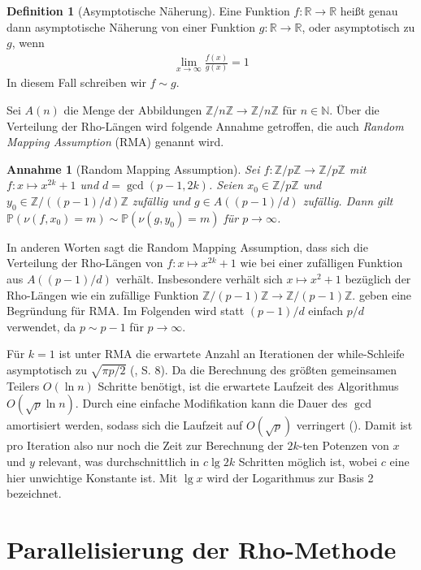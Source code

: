 \documentclass[a4paper, 11pt, ngerman]{article}
\newcommand{\N}{\mathbb{N}}
\newcommand{\R}{\mathbb{R}}
\newcommand{\Z}{\mathbb{Z}}
\renewcommand{\P}{\mathbb{P}}
\theoremstyle{definition}
\newtheorem{definition}{Definition}
\theoremstyle{plain}
\newtheorem*{assumption*}{Annahme}
\theoremstyle{remark}
\begin{document}
\begin{definition}[Asymptotische Näherung]
    Eine Funktion $f : \R \to \R$ heißt genau dann asymptotische Näherung von einer Funktion $g : \R \to \R$, oder asymptotisch zu $g$, wenn
    \begin{align*}
        \lim_{x \to \infty} \frac {f(x)} {g(x)} = 1
    \end{align*}
    In diesem Fall schreiben wir $f \sim g$.
\end{definition}

\noindent Sei $A(n)$ die Menge der Abbildungen $\Z/n\Z \to \Z/n\Z$ für $n \in \N$. Über die Verteilung der Rho-Längen wird folgende Annahme getroffen, die auch \emph{Random Mapping Assumption} (RMA) genannt wird.

\begin{assumption*}[Random Mapping Assumption]
    Sei $f: \Z/p\Z \to \Z/p\Z$ mit $f : x \mapsto x^{2k} + 1$ und $d = \gcd(p - 1, 2k)$. Seien $x_0 \in \Z/p\Z$ und $y_0 \in \Z/((p - 1)/d)\Z$ zufällig und $g \in A((p - 1)/d)$ zufällig. Dann gilt $\P(\nu(f, x_0) = m) \sim \P(\nu(g, y_0) = m)$ für $p \to \infty$.
\end{assumption*}

\noindent In anderen Worten sagt die Random Mapping Assumption, dass sich die Verteilung der Rho-Längen von $f : x \mapsto x^{2k} + 1$ wie bei einer zufälligen Funktion aus $A((p - 1)/d)$ verhält. Insbesondere verhält sich $x \mapsto x^2 + 1$ bezüglich der Rho-Längen wie ein zufällige Funktion $\Z/(p - 1)\Z \to \Z/(p - 1)\Z$. \cite{bp81} geben eine Begründung für RMA. Im Folgenden wird statt $(p - 1)/d$ einfach $p/d$ verwendet, da $p \sim p - 1$ für $p \to \infty$.

Für $k = 1$ ist unter RMA die erwartete Anzahl an Iterationen der while-Schleife asymptotisch zu $\sqrt{\pi p / 2}$ (\cite{knu98}, S. 8). Da die Berechnung des größten gemeinsamen Teilers $O(\ln n)$ Schritte benötigt, ist die erwartete Laufzeit des Algorithmus $O(\sqrt p \ln n)$. Durch eine einfache Modifikation kann die Dauer des $\gcd$ amortisiert werden, sodass sich die Laufzeit auf $O(\sqrt p)$ verringert (\cite{bre80}). Damit ist pro Iteration also nur noch die Zeit zur Berechnung der $2k$-ten Potenzen von $x$ und $y$ relevant, was durchschnittlich in $c \lg 2k$ Schritten möglich ist, wobei $c$ eine hier unwichtige Konstante ist. Mit $\lg x$ wird der Logarithmus zur Basis 2 bezeichnet.

\section{Parallelisierung der Rho-Methode}
\end{document}
